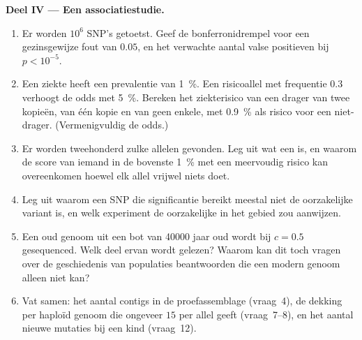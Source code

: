 \begin{problem}
\medskip
\noindent\textbf{Deel IV --- Een associatiestudie.}
\begin{enumerate}[resume]
  \item Er worden $10^{6}$ SNP's getoetst. Geef de bonferronidrempel
        voor een gezinsgewijze fout van $0.05$, en het verwachte aantal
        valse positieven bij $p < 10^{-5}$.
  \item Een ziekte heeft een prevalentie van \qty{1}{\%}. Een
        risicoallel met frequentie $0.3$ verhoogt de odds met
        \qty{5}{\%}. Bereken het ziekterisico van een drager van twee
        kopieën, van één kopie en van geen enkele, met \qty{0.9}{\%}
        als risico voor een niet-drager. (Vermenigvuldig de odds.)
  \item Er worden tweehonderd zulke allelen gevonden. Leg uit wat een
         is, en waarom de score van iemand in de bovenste
        \qty{1}{\%} met een meervoudig risico kan overeenkomen hoewel
        elk allel vrijwel niets doet.
  \item Leg uit waarom een SNP die significantie bereikt meestal niet de
        oorzakelijke variant is, en welk experiment de oorzakelijke in
        het gebied zou aanwijzen.
  \item Een oud genoom uit een bot van \num{40000} jaar oud wordt bij
        $c = 0.5$ gesequenced. Welk deel ervan wordt gelezen? Waarom kan
        dit toch vragen over de geschiedenis van populaties
        beantwoorden die een modern genoom alleen niet kan?
  \item Vat samen: het aantal contigs in de proefassemblage (vraag~4),
        de dekking per haploïd genoom die ongeveer $15$  per allel
        geeft (vraag~7--8), en het aantal nieuwe mutaties bij een kind
        (vraag~12).
\end{enumerate}
\end{problem}
